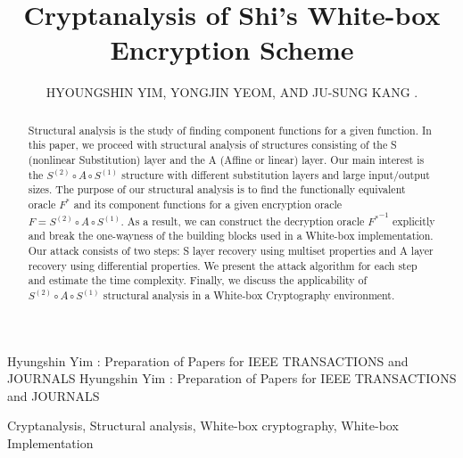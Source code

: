 \documentclass{ieeeaccess}
\begin{document}

\title{Cryptanalysis of Shi's White-box Encryption Scheme}
\author{\uppercase{Hyoungshin Yim},
\uppercase{Yongjin Yeom, and Ju-Sung Kang
}.
}
\address[1]{Department of Financial information security, 
Kookmin University, Seoul 02707, South Korea}
\address[2]{Department of Information Security, Cryptology, and Mathematics
Kookmin University, Seoul 02707, South Korea}



\markboth
{Hyungshin Yim \headeretal: Preparation of Papers for IEEE TRANSACTIONS and JOURNALS}
{Hyungshin Yim \headeretal: Preparation of Papers for IEEE TRANSACTIONS and JOURNALS}



\begin{abstract}
Structural analysis is the study of finding component functions for a given function.  
In this paper, we proceed with structural analysis of structures consisting of the S (nonlinear Substitution) layer and the A (Affine or linear) layer. 
Our main interest is the $S^{(2)}\circ A\circ S^{(1)}$ structure with different substitution layers and large input/output sizes. 
The purpose of our structural analysis is to find the functionally equivalent oracle $F^*$ 
and its component functions for a given encryption oracle $F=S^{(2)}\circ A\circ S^{(1)}$. 
As a result, we can construct the decryption oracle ${F^*}^{-1}$ explicitly and 
break the one-wayness of the building blocks used in a White-box implementation. 
Our attack consists of two steps: S layer recovery using multiset properties and A layer recovery using differential properties. 
We present the attack algorithm for each step and estimate the time complexity. 
Finally, we discuss the applicability of $S^{(2)}\circ A\circ S^{(1)}$ structural analysis in a White-box Cryptography environment.
\end{abstract}

\begin{keywords}
Cryptanalysis, Structural analysis, White-box cryptography, White-box Implementation
\end{keywords}
\end{document}
